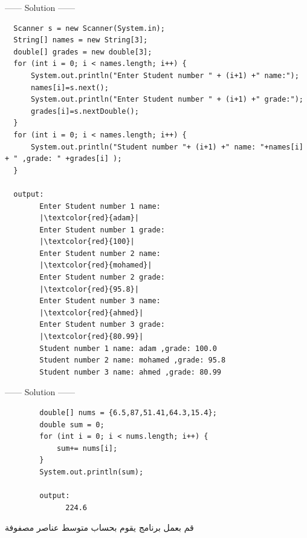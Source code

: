 \begin{example}
              
  \begin{center}
    ------ \textcolor{Solution}{Solution} ------ 
  \end{center}
  \begin{verbatim}
  Scanner s = new Scanner(System.in);
  String[] names = new String[3];
  double[] grades = new double[3];
  for (int i = 0; i < names.length; i++) {
      System.out.println("Enter Student number " + (i+1) +" name:");
      names[i]=s.next();
      System.out.println("Enter Student number " + (i+1) +" grade:");
      grades[i]=s.nextDouble();
  }
  for (int i = 0; i < names.length; i++) {
      System.out.println("Student number "+ (i+1) +" name: "+names[i] + " ,grade: " +grades[i] );
  }

  output:
        Enter Student number 1 name:
        |\textcolor{red}{adam}|
        Enter Student number 1 grade:
        |\textcolor{red}{100}|
        Enter Student number 2 name:
        |\textcolor{red}{mohamed}|
        Enter Student number 2 grade:
        |\textcolor{red}{95.8}|
        Enter Student number 3 name:
        |\textcolor{red}{ahmed}|
        Enter Student number 3 grade:
        |\textcolor{red}{80.99}|
        Student number 1 name: adam ,grade: 100.0
        Student number 2 name: mohamed ,grade: 95.8
        Student number 3 name: ahmed ,grade: 80.99
  \end{verbatim}
\end{example}
\begin{minipage}[h]{1\textwidth}
\begin{example}
              
  \begin{center}
    ------ \textcolor{Solution}{Solution} ------ 
  \end{center}
  \begin{verbatim}
        double[] nums = {6.5,87,51.41,64.3,15.4};
        double sum = 0;
        for (int i = 0; i < nums.length; i++) {
            sum+= nums[i];
        }
        System.out.println(sum);

        output:
              224.6
  \end{verbatim}
\end{example}
\end{minipage}
\begin{task}
  \begin{AR}
    قم بعمل برنامج يقوم بحساب متوسط عناصر مصفوفة
  \end{AR}
\end{task}
